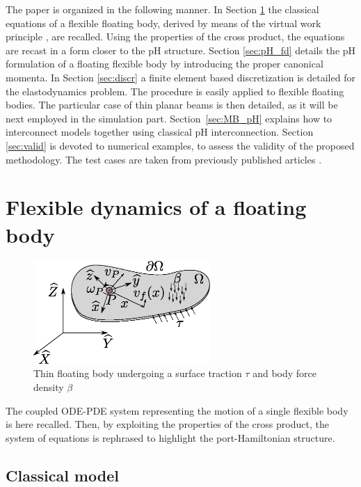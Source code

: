 \documentclass{svjour3}                     %
\begin{document}
\indent The paper is organized in the following manner. In Section \ref{sec:class_model} the classical equations of a flexible floating body, derived by means of the virtual work principle \cite{MB_Daepde,simeon2013computational}, are recalled. Using the properties of the cross product, the equations are recast in a form closer to the pH structure. Section \ref{sec:pH_fd} details the pH formulation of a floating flexible body by introducing the proper canonical momenta. In Section \ref{sec:discr} a finite element based discretization is detailed for the elastodynamics problem. The procedure is easily applied to flexible floating bodies. The particular case of thin planar beams is then detailed, as it will be next employed in the simulation part. Section~\ref{sec:MB_pH} explains how to interconnect models together using classical pH interconnection. Section \ref{sec:valid} is devoted to numerical examples, to assess the validity of the proposed methodology. The test cases are taken from previously published articles \cite{Chebbi2017,Ellenbroek2018}.

 

\section{Flexible dynamics of a floating body}
\label{sec:class_model}
\begin{figure}[t]
	\centering
	\includegraphics[width=0.6\textwidth]{floating_body.eps} 
	\caption{Thin floating body undergoing a surface traction $\tau$ and body force density $\beta$}
	\label{fig:float_body}
\end{figure}
The coupled ODE-PDE system representing the motion of a single flexible body is here recalled. Then, by exploiting the properties of the cross product, the system of equations is rephrased to highlight the port-Hamiltonian structure.

\subsection{Classical model}
\end{document}
